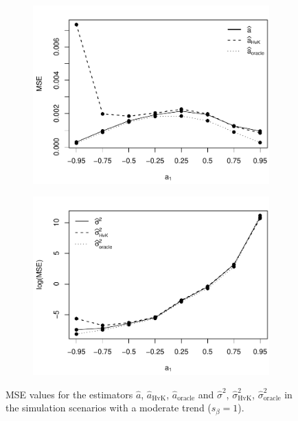 \begin{figure}[t!]
\begin{subfigure}[b]{0.475\textwidth}
\includegraphics[width=\textwidth]{Plots/MSE_a1_T=500_slope=1_(q,r,M1,M2)=(25,10,20,30).pdf}
\end{subfigure}\hspace{0.25cm}
\begin{subfigure}[b]{0.475\textwidth}
\includegraphics[width=\textwidth]{Plots/MSE_lrv_T=500_slope=1_(q,r,M1,M2)=(25,10,20,30).pdf}
\end{subfigure}
\caption{MSE values for the estimators $\widehat{a}$, $\widehat{a}_{\text{HvK}}$, $\widehat{a}_{\text{oracle}}$ and $\widehat{\sigma}^2$, $\widehat{\sigma}^2_{\text{HvK}}$, $\widehat{\sigma}^2_{\text{oracle}}$ in the simulation scenarios with a moderate trend ($s_\beta=1$).}\label{fig:MSE_slope1}
\vspace{0.25cm}



\end{figure}
